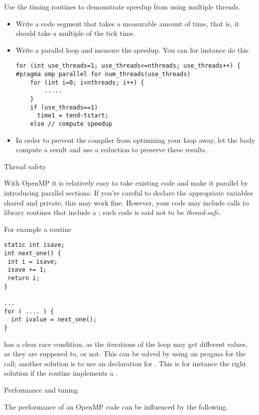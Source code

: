 \begin{exercise}
  Use the timing routines to demonstrate speedup from using
  multiple threads.
  \begin{itemize}
  \item Write a code segment that takes a measurable amount of time, that is,
    it should take a multiple of the tick time.
  \item Write a parallel loop and measure the speedup. You can for instance do this
\begin{lstlisting}
for (int use_threads=1; use_threads<=nthreads; use_threads++) {
#pragma omp parallel for num_threads(use_threads)
    for (int i=0; i<nthreads; i++) {
        .....
    }
    if (use_threads==1)
      time1 = tend-tstart;
    else // compute speedup
\end{lstlisting}
\item In order to prevent the compiler from optimizing your loop away, let
  the body compute a result and use a reduction to preserve these results.
  \end{itemize}
\end{exercise}

 {Thread safety}

With OpenMP it is relatively easy to take existing code and make
it parallel by introducing parallel sections. If you're careful
to declare the appropriate variables shared and private,
this may work fine. However, your code may include
calls to library routines that include a ;
such code is said not to be \emph{thread-safe}.

For example a routine
\begin{lstlisting}
static int isave;
int next_one() {
 int i = isave;
 isave += 1;
 return i;
}

...
for ( .... ) {
  int ivalue = next_one();
}
\end{lstlisting}
has a clear race condition, as the iterations of the loop
may get different  values, as they are supposed to,
or not. This can be solved by using an 
pragma for the  call; another solution 
is to use an  declaration for .
This is for instance the right solution if  the 
routine implements a .


 {Performance and tuning}

The performance of an OpenMP code can be influenced by the following.

